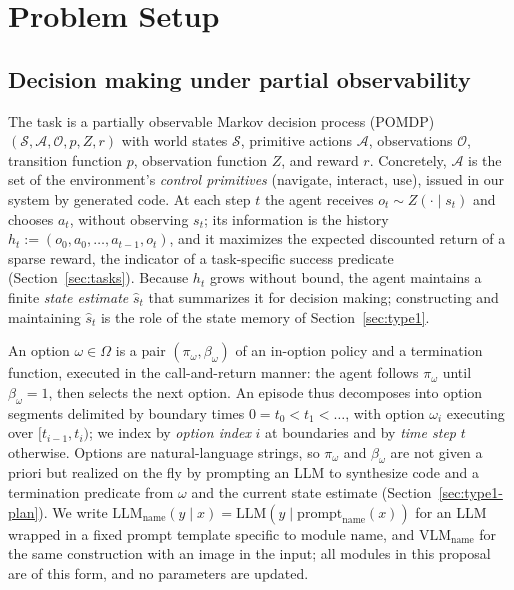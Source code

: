 \documentclass[10pt]{article}
\newcommand{\llm}[1]{\mathrm{LLM}_{\mathrm{#1}}}
\newcommand{\calS}{\mathcal{S}}
\newcommand{\calA}{\mathcal{A}}
\newcommand{\calO}{\mathcal{O}}
\newcommand{\shat}{\hat{s}}
\newcommand{\vlm}[1]{\mathrm{VLM}_{\mathrm{#1}}}
\begin{document}
\section{Problem Setup}
\label{sec:setup}

\subsection{Decision making under partial observability}
\label{sec:pomdp}

The task is a partially observable Markov decision process (POMDP) \cite{kaelbling1998pomdp} $(\calS,\calA,\calO,p,Z,r)$ with world states $\calS$, primitive actions $\calA$, observations $\calO$, transition function $p$, observation function $Z$, and reward $r$. Concretely, $\calA$ is the set of the environment's \emph{control primitives} (navigate, interact, use), issued in our system by generated code. At each step $t$ the agent receives $o_t\sim Z(\cdot\mid s_t)$ and chooses $a_t$, without observing $s_t$; its information is the history $h_t:=(o_0,a_0,\dots,a_{t-1},o_t)$, and it maximizes the expected discounted return of a sparse reward, the indicator of a task-specific success predicate (Section~\ref{sec:tasks}). Because $h_t$ grows without bound, the agent maintains a finite \emph{state estimate} $\shat_t$ that summarizes it for decision making; constructing and maintaining $\shat_t$ is the role of the state memory of Section~\ref{sec:type1}.

An option \cite{sutton1999options} $\omega\in\Omega$ is a pair $(\pi_\omega,\beta_\omega)$ of an in-option policy and a termination function, executed in the call-and-return manner: the agent follows $\pi_\omega$ until $\beta_\omega=1$, then selects the next option. An episode thus decomposes into option segments delimited by boundary times $0=t_0<t_1<\dots$, with option $\omega_i$ executing over $[t_{i-1},t_i)$; we index by \emph{option index} $i$ at boundaries and by \emph{time step} $t$ otherwise. Options are natural-language strings, so $\pi_\omega$ and $\beta_\omega$ are not given a priori but realized on the fly by prompting an LLM to synthesize code and a termination predicate from $\omega$ and the current state estimate (Section~\ref{sec:type1-plan}). We write $\llm{name}(y\mid x)=\mathrm{LLM}(y\mid\mathrm{prompt}_{\mathrm{name}}(x))$ for an LLM wrapped in a fixed prompt template specific to module $\mathrm{name}$, and $\vlm{name}$ for the same construction with an image in the input; all modules in this proposal are of this form, and no parameters are updated.
\end{document}
